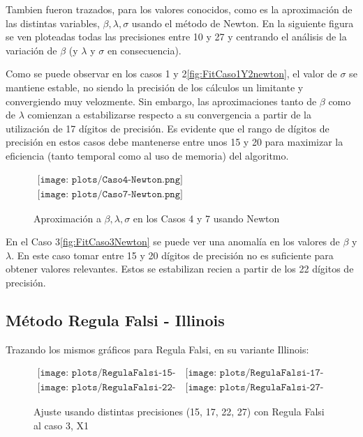 Tambien fueron trazados, para los valores conocidos, como es la 
aproximaci\'on de las distintas variables, $\beta, \lambda, \sigma$ usando el 
m\'etodo de Newton. En la siguiente figura se ven ploteadas todas las 
precisiones entre 10 y 27 y centrando el an\'alisis de la variaci\'on de 
$\beta$ (y $\lambda$ y $\sigma$ en consecuencia).

Como se puede observar en los casos 1 y 2\ref{fig:FitCaso1Y2newton}, el valor de $\sigma$ se mantiene 
estable, no siendo la precisi\'on de los c\'alculos un limitante y convergiendo 
muy velozmente. Sin embargo, las aproximaciones tanto de $\beta$ como de 
$\lambda$ comienzan a estabilizarse respecto a su convergencia a partir de la 
utilizaci\'on de 17 d\'igitos de precisi\'on. Es evidente que el rango de 
d\'igitos de precisi\'on en estos casos debe mantenerse entre unos 15 y 20 
para maximizar la eficiencia (tanto temporal como al uso de memoria) del 
algoritmo.  

\begin{figure} [H]
$\begin{array}{c}
\texttt{[image: plots/Caso4-Newton.png]} \\
\texttt{[image: plots/Caso7-Newton.png]}
\end{array}$
\caption{Aproximaci\'on a $\beta, \lambda, \sigma$ en los Casos 4 y 7 
usando Newton}
\label{fig:Fit4Y7Newton}
\end{figure}

En el Caso 3\ref{fig:FitCaso3Newton} se puede ver una anomal\'ia en los valores de $\beta$ y $\lambda$. 
En este caso tomar entre 15 y 20 d\'igitos de precisi\'on no es suficiente para 
obtener valores relevantes. Estos se estabilizan recien a partir de los 22 
d\'igitos de precisi\'on.


\subsection{M\'etodo Regula Falsi - Illinois}

Trazando los mismos gr\'aficos para Regula Falsi, en su variante Illinois:

\begin{figure} [H]
$\begin{array}{cc}
\texttt{[image: plots/RegulaFalsi-15-caso3.png]} &
\texttt{[image: plots/RegulaFalsi-17-caso3.png]} \\
\texttt{[image: plots/RegulaFalsi-22-caso3.png]} &
\texttt{[image: plots/RegulaFalsi-27-caso3.png]}
\end{array}$
\caption{Ajuste usando distintas precisiones (15, 17, 22, 27) con 
Regula Falsi al caso 3, X1}
\label{fig:FitCaso3RegulaFalsi}
\end{figure}

